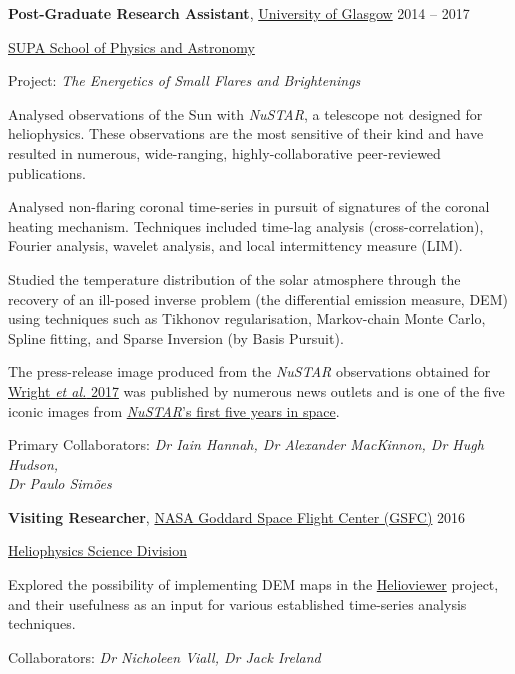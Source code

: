 \documentclass[11pt]{article}
\newcommand{\makeheading}[2][]%
        {\hspace*{-\marginparsep minus \marginparwidth}%
         \begin{minipage}[t]{\textwidth+\marginparwidth+\marginparsep}%
             {\large \bfseries #2 \hfill #1}\\[-0.15\baselineskip]%
                 \rule{\columnwidth}{1pt}%
         \end{minipage}}
\newcommand{\halfblankline}{\quad\vspace{-0.5\baselineskip}\pagebreak[3]}
\begin{document}
 \textbf{Post-Graduate Research Assistant},
            \href{http://www.gla.ac.uk/}{University of Glasgow}
            \hfill {2014 -- 2017}
\begin{innerlist}

    \item[] \href{http://www.astro.gla.ac.uk/}{SUPA School of Physics and Astronomy}
    \begin{innerlist}
    	\item[] Project: \emph{The Energetics of Small Flares and Brightenings}
    	\item{} Analysed observations of the Sun with {\it NuSTAR}, a telescope not designed for heliophysics. These observations are the most sensitive of their kind and have resulted in numerous, wide-ranging, highly-collaborative peer-reviewed publications.
    	\item{} Analysed non-flaring coronal time-series in pursuit of signatures of the coronal heating mechanism. Techniques included time-lag analysis (cross-correlation), Fourier analysis, wavelet analysis, and local intermittency measure (LIM).
    	\item{} Studied the temperature distribution of the solar atmosphere through the recovery of an ill-posed inverse problem (the differential emission measure, DEM) using techniques such as Tikhonov regularisation, Markov-chain Monte Carlo, Spline fitting, and Sparse Inversion (by Basis Pursuit).
         \item{} The press-release image produced from the {\it NuSTAR} observations obtained for \href{https://doi.org/10.3847/1538-4357/aa7a59}{Wright {\it et al.} 2017} was published by numerous news outlets and is one of the five iconic images from \href{https://www.nasa.gov/feature/jpl/nustars-first-five-years-in-space}{{\it NuSTAR}'s first five years in space}.
    \end{innerlist}
        	\item[] Primary Collaborators: {\it Dr Iain Hannah, Dr Alexander MacKinnon, Dr Hugh Hudson, \\ Dr Paulo Sim{\~o}es}
\end{innerlist}
 
%
\halfblankline

\textbf{Visiting Researcher},
	\href{https://www.nasa.gov/goddard}{NASA Goddard Space Flight Center (GSFC)} \hfill {2016}
\begin{innerlist}

    \item[] \href{https://science.gsfc.nasa.gov/heliophysics/}{Heliophysics Science Division}
    \begin{innerlist}
    	\item{} Explored the possibility of implementing DEM maps in the \href{www.helioviewer.org}{Helioviewer} project, and their usefulness as an input for various established time-series analysis techniques.
    \end{innerlist}
        	\item[] Collaborators: {\it Dr Nicholeen Viall, Dr Jack Ireland}

\end{innerlist}
\end{document}
